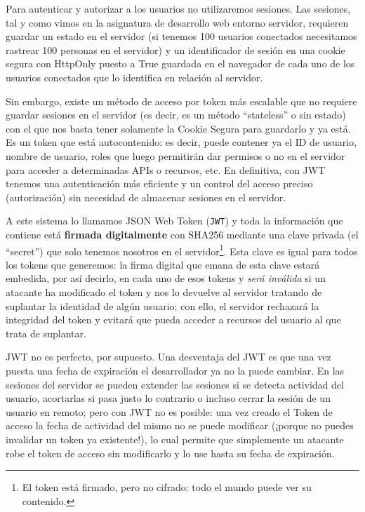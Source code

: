 \documentclass[a4paper,12pt]{report}
\begin{document}
				Para autenticar y autorizar a los usuarios no utilizaremos sesiones. Las sesiones, tal y como vimos en la asignatura de desarrollo web entorno servidor, requieren guardar un estado en el servidor (si tenemos 100 usuarios conectados necesitamos rastrear 100 personas en el servidor) y un identificador de sesión en una cookie segura con HttpOnly puesto a True guardada en el navegador de cada uno de los usuarios conectados que lo identifica en relación al servidor.
				
				Sin embargo, existe un método de acceso por token más escalable que no requiere guardar sesiones en el servidor (es decir, es un método ``stateless'' o sin estado) con el que nos basta tener solamente la Cookie Segura para guardarlo y ya está. Es un token que está autocontenido: es decir, puede contener ya el ID de usuario, nombre de usuario, roles que luego permitirán dar permisos o no en el servidor para acceder a determinadas APIs o recursos, etc. En definitiva, con JWT tenemos una autenticación más eficiente y un control del acceso preciso (autorización) sin necesidad de almacenar sesiones en el servidor.
				
				
				A este sistema lo llamamos JSON Web Token (\texttt{JWT}) y toda la información que contiene está \textbf{firmada digitalmente} con SHA256 mediante una clave privada (el ``secret'') que solo tenemos nosotros en el servidor\footnote{El token está firmado, pero no cifrado: todo el mundo puede ver su contenido.}. Esta clave es igual para todos los tokens que generemos: la firma digital que emana de esta clave estará embedida, por así decirlo, en cada uno de esos tokens y \textit{será inválida} si un atacante ha modificado el token y nos lo devuelve al servidor tratando de suplantar la identidad de algún usuario; con ello, el servidor rechazará la integridad del token y evitará que pueda acceder a recursos del usuario al que trata de suplantar.
				
				JWT no es perfecto, por supuesto. Una desventaja del JWT es que una vez puesta una fecha de expiración el desarrollador ya no la puede cambiar. En las sesiones del servidor se pueden extender las sesiones si se detecta actividad del usuario, acortarlas si pasa justo lo contrario o incluso cerrar la sesión de un usuario en remoto; pero con JWT no es posible: una vez creado el Token de acceso la fecha de actividad del mismo no se puede modificar (¡porque no puedes invalidar un token ya existente!), lo cual permite que simplemente un atacante robe el token de acceso sin modificarlo y lo use hasta su fecha de expiración.
				
\end{document}
